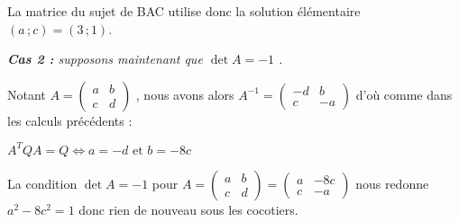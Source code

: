 \medskip

La matrice du sujet de BAC utilise donc la solution élémentaire
$(a \,; c) = (3 \,; 1)$.




\bigskip

\textit{\textbf{Cas 2 :} supposons maintenant que $\det A = -1$ .}

\medskip

Notant
$A = \begin{pmatrix} 
  a & b \\ 
  c & d
\end{pmatrix}$ ,
nous avons alors
$A^{-1} = \begin{pmatrix} 
  -d & b  \\ 
   c & -a
\end{pmatrix}$
d'où comme dans les calculs précédents :

\medskip

$A^T Q A = Q \Longleftrightarrow a = -d \text{ et } b = -8c$


\bigskip

La condition $\det A = -1$ pour
$A
=
\begin{pmatrix} 
  a & b \\ 
  c & d
\end{pmatrix}
=
\begin{pmatrix} 
  a & -8c \\ 
  c & -a
\end{pmatrix}$
nous redonne
$a^2 - 8c^2 = 1$ donc rien de nouveau sous les cocotiers.

